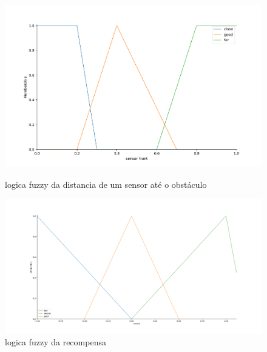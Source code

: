 \documentclass[
	12pt,				%
	openright,			%
	oneside,			%
	a4paper,			%
	brazil,				%
	]{abntex2}
\begin{document}
\begin{figure}[H]
	\centering
	 \includegraphics[width = 1\textwidth]{Imagens/sensor.png}
	 \caption{logica fuzzy da distancia de um sensor até o obstáculo}
	 \label{sensor}
	
	 \includegraphics[width = 1\textwidth]{Imagens/reward.png}
	 \caption{logica fuzzy da recompensa}
	 \label{reward}
	 
\end{figure}%
%
\end{document}
